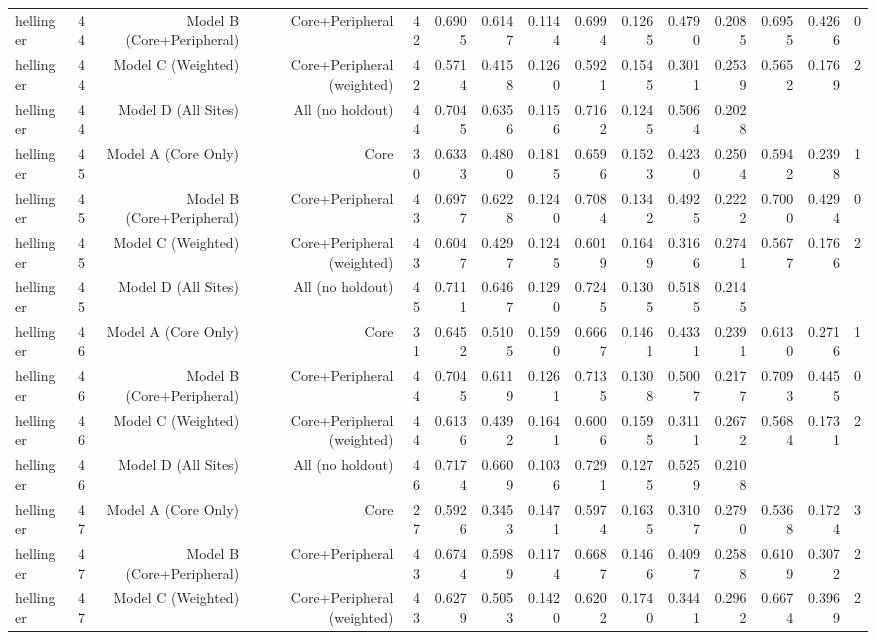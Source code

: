 {\begin{longtable}{lrrrrrrrrrrrrrr}
  hellinger & 44 & Model B (Core+Peripheral) & Core+Peripheral & 42 & 0.6905 & 0.6147 & 0.1144 & 0.6994 & 0.1265 & 0.4790 & 0.2085 & 0.6955 & 0.4266 & 0 \\
  hellinger & 44 & Model C (Weighted) & Core+Peripheral (weighted) & 42 & 0.5714 & 0.4158 & 0.1260 & 0.5921 & 0.1545 & 0.3011 & 0.2539 & 0.5652 & 0.1769 & 2 \\
  hellinger & 44 & Model D (All Sites) & All (no holdout) & 44 & 0.7045 & 0.6356 & 0.1156 & 0.7162 & 0.1245 & 0.5064 & 0.2028 &  &  &  \\
  hellinger & 45 & Model A (Core Only) & Core & 30 & 0.6333 & 0.4800 & 0.1815 & 0.6596 & 0.1523 & 0.4230 & 0.2504 & 0.5942 & 0.2398 & 1 \\
  hellinger & 45 & Model B (Core+Peripheral) & Core+Peripheral & 43 & 0.6977 & 0.6228 & 0.1240 & 0.7084 & 0.1342 & 0.4925 & 0.2222 & 0.7000 & 0.4294 & 0 \\
  hellinger & 45 & Model C (Weighted) & Core+Peripheral (weighted) & 43 & 0.6047 & 0.4297 & 0.1245 & 0.6019 & 0.1649 & 0.3166 & 0.2741 & 0.5677 & 0.1766 & 2 \\
  hellinger & 45 & Model D (All Sites) & All (no holdout) & 45 & 0.7111 & 0.6467 & 0.1290 & 0.7245 & 0.1305 & 0.5185 & 0.2145 &  &  &  \\
  hellinger & 46 & Model A (Core Only) & Core & 31 & 0.6452 & 0.5105 & 0.1590 & 0.6667 & 0.1461 & 0.4331 & 0.2391 & 0.6130 & 0.2716 & 1 \\
  hellinger & 46 & Model B (Core+Peripheral) & Core+Peripheral & 44 & 0.7045 & 0.6119 & 0.1261 & 0.7135 & 0.1308 & 0.5007 & 0.2177 & 0.7093 & 0.4455 & 0 \\
  hellinger & 46 & Model C (Weighted) & Core+Peripheral (weighted) & 44 & 0.6136 & 0.4392 & 0.1641 & 0.6006 & 0.1595 & 0.3111 & 0.2672 & 0.5684 & 0.1731 & 2 \\
  hellinger & 46 & Model D (All Sites) & All (no holdout) & 46 & 0.7174 & 0.6609 & 0.1036 & 0.7291 & 0.1275 & 0.5259 & 0.2108 &  &  &  \\
  hellinger & 47 & Model A (Core Only) & Core & 27 & 0.5926 & 0.3453 & 0.1471 & 0.5974 & 0.1635 & 0.3107 & 0.2790 & 0.5368 & 0.1724 & 3 \\
  hellinger & 47 & Model B (Core+Peripheral) & Core+Peripheral & 43 & 0.6744 & 0.5989 & 0.1174 & 0.6687 & 0.1466 & 0.4097 & 0.2588 & 0.6109 & 0.3072 & 2 \\
  hellinger & 47 & Model C (Weighted) & Core+Peripheral (weighted) & 43 & 0.6279 & 0.5053 & 0.1420 & 0.6202 & 0.1740 & 0.3441 & 0.2962 & 0.6674 & 0.3969 & 2 \\

\end{longtable}}
